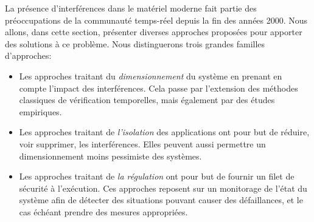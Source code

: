 

La présence d'interférences dans le matériel moderne fait partie des préoccupations de la communauté temps-réel depuis la fin des années 2000.
Nous allons, dans cette section, présenter diverses approches proposées pour apporter des solutions à ce problème.
Nous distinguerons trois grandes familles d'approches:
\begin{itemize}
	\item Les approches traitant du \emph{dimensionnement} du système en prenant en compte l'impact des interférences. Cela passe par l'extension des méthodes classiques de vérification temporelles, mais également par des études empiriques.

	\item Les approches traitant de \emph{l'isolation} des applications ont pour but de réduire, voir supprimer, les interférences. Elles peuvent aussi permettre un dimensionnement moins pessimiste des systèmes. 

	\item Les approches traitant de \emph{la régulation} ont pour but de fournir un filet de sécurité à l'exécution. Ces approches reposent sur un monitorage de l'état du système afin de détecter des situations pouvant causer des défaillances, et le cas échéant prendre des mesures appropriées.
\end{itemize}

